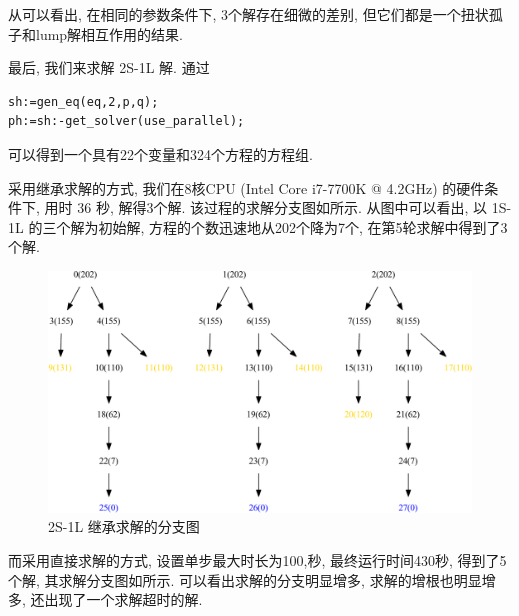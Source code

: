 从可以看出, 在相同的参数条件下, 3个解存在细微的差别, 但它们都是一个扭状孤子和lump解相互作用的结果. 

最后, 我们来求解 2S-1L 解. 通过
\begin{verbatim}
sh:=gen_eq(eq,2,p,q);
ph:=sh:-get_solver(use_parallel);
\end{verbatim}
可以得到一个具有22个变量和324个方程的方程组. 

采用继承求解的方式, 我们在8核CPU (Intel Core i7-7700K @ 4.2GHz) 的硬件条件下, 用时 36 秒, 解得3个解. 该过程的求解分支图如所示. 从图中可以看出, 以 1S-1L 的三个解为初始解, 方程的个数迅速地从202个降为7个, 在第5轮求解中得到了3个解. 

\begin{figure}[htbp]
\centering
\includegraphics[width=\textwidth]{fig/2S1L-ext.pdf}
\caption{2S-1L 继承求解的分支图}\label{sb2-e}
\end{figure}

而采用直接求解的方式, 设置单步最大时长为100,秒, 最终运行时间430秒, 得到了5个解, 其求解分支图如所示. 可以看出求解的分支明显增多, 求解的增根也明显增多, 还出现了一个求解超时的解.  


